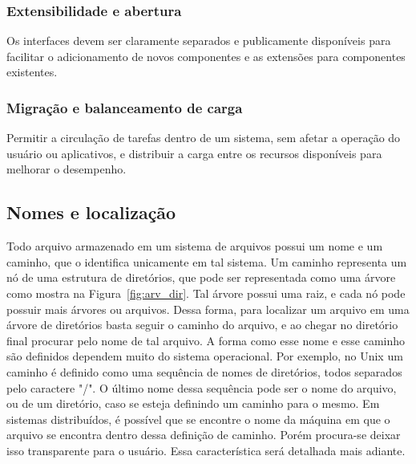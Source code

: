 	
	\subsubsection{Extensibilidade e abertura}
	Os interfaces devem ser claramente separados e publicamente disponíveis para facilitar o adicionamento de novos componentes e as extensões para componentes existentes.
	
	\subsubsection{Migração e balanceamento de carga}
	Permitir a circulação de tarefas dentro de um sistema, sem afetar a operação do usuário ou aplicativos, e distribuir a carga entre os recursos disponíveis para melhorar o desempenho.
	
	
	
		
	\subsection{Nomes e localização}
	Todo arquivo armazenado em um sistema de arquivos possui um nome e um caminho, que o identifica unicamente em tal sistema.
	Um caminho representa um nó de uma estrutura de diretórios, que pode ser representada como uma árvore como mostra na Figura~\ref{fig:arv_dir}.
	Tal árvore possui uma raiz, e cada nó pode possuir mais árvores ou arquivos.
	Dessa forma, para localizar um arquivo em uma árvore de diretórios basta seguir o caminho do arquivo, e ao chegar no diretório final procurar pelo nome de tal arquivo.
	A forma como esse nome e esse caminho são definidos dependem muito do sistema operacional. Por exemplo, no Unix um caminho é definido como uma sequência de nomes de diretórios, todos separados pelo caractere "/". O último nome dessa sequência pode ser o nome do arquivo, ou de um diretório, caso se esteja definindo um caminho para o mesmo.
	Em sistemas distribuídos, é possível que se encontre o nome da máquina em que o arquivo se encontra dentro dessa definição de caminho. Porém procura-se deixar isso transparente para o usuário. Essa característica será detalhada mais adiante.
	
